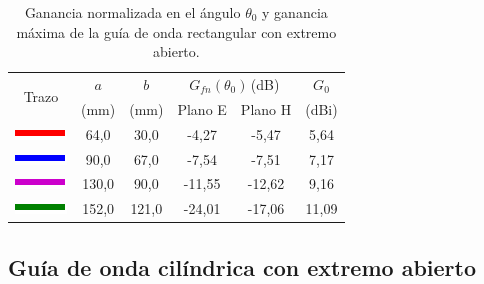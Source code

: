 \begin{table}[H]
\centering
\begin{tabular}{|c|c|c|c|c|c|}
\hline
\multirow{2}{*}{Trazo} & $a$ & $b$ & \multicolumn{2}{c|}{$G_{fn}\left(\theta_0\right)\,$(dB)} & $G_0$ \\
\cline{4-5}
& (mm) & (mm) & Plano E & Plano H & (dBi)\\
\hline
\includegraphics[scale = 1]{Figures/Estudio/linea_tabla_rojo} & 64,0 & 30,0 & -4,27 & -5,47 & 5,64 \\
\hline
\includegraphics[scale = 1]{Figures/Estudio/linea_tabla_azul} & 90,0 & 67,0 & -7,54 & -7,51 & 7,17 \\
\hline
\includegraphics[scale = 1]{Figures/Estudio/linea_tabla_violeta} & 130,0 & 90,0 & -11,55 & -12,62 & 9,16 \\
\hline
\includegraphics[scale = 1]{Figures/Estudio/linea_tabla_verde} & 152,0 & 121,0 & -24,01 & -17,06 & 11,09 \\
\hline
\end{tabular}
\caption{Ganancia normalizada en el ángulo $\theta_0$ y ganancia máxima de la guía de onda rectangular con extremo abierto.}
\label{tabla_estudio:5}
\end{table}

\subsection{Guía de onda cilíndrica con extremo abierto}
\label{subsec_estudio_guia_cili}

